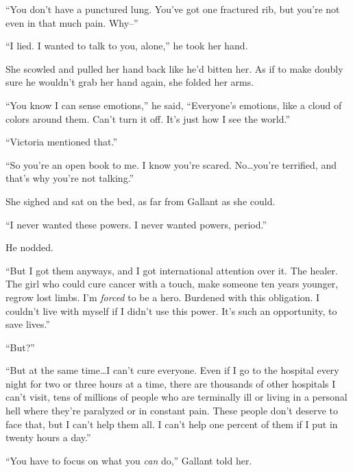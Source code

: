 ``You don't have a punctured lung.  You've got one fractured rib, but you're not even in that much pain.  Why--''



``I lied.  I wanted to talk to you, alone,'' he took her hand.



She scowled and pulled her hand back like he'd bitten her.  As if to make doubly sure he wouldn't grab her hand again, she folded her arms.



``You know I can sense emotions,'' he said, ``Everyone's emotions, like a cloud of colors around them.  Can't turn it off.  It's just how I see the world.''



``Victoria mentioned that.''



``So you're an open book to me.  I know you're scared.  No\ldots you're terrified, and that's why you're not talking.''



She sighed and sat on the bed, as far from Gallant as she could.



``I never wanted these powers.  I never wanted powers, period.''



He nodded.



``But I got them anyways, and I got international attention over it.  The healer.  The girl who could cure cancer with a touch, make someone ten years younger, regrow lost limbs.  I'm \emph{forced} to be a hero.  Burdened with this obligation.  I couldn't live with myself if I didn't use this power.  It's such an opportunity, to save lives.''



``But?''



``But at the same time\ldots I can't cure everyone.  Even if I go to the hospital every night for two or three hours at a time, there are thousands of other hospitals I can't visit, tens of millions of people who are terminally ill or living in a personal hell where they're paralyzed or in constant pain.  These people don't deserve to face that, but I can't help them all.  I can't help one percent of them if I put in twenty hours a day.''



``You have to focus on what you \emph{can} do,'' Gallant told her.



